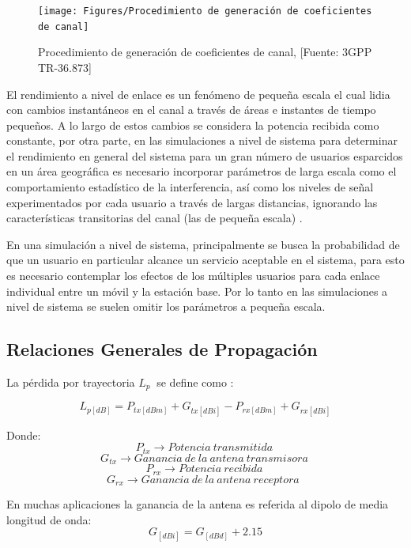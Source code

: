 \begin{figure}[th]
\centering
\texttt{[image: Figures/Procedimiento de generación de coeficientes de canal]}
\decoRule
\caption[Procedimiento de generación de coeficientes de canal]{Procedimiento de generación de coeficientes de canal, [Fuente: 3GPP TR-36.873]}
\label{fig:Procedimiento de generacion de coeficientes de canal}
\end{figure}

El rendimiento a nivel de enlace es un fenómeno de pequeña escala el cual lidia con cambios instantáneos en el canal a través de áreas e instantes de tiempo pequeños. A lo largo de estos cambios se considera la potencia recibida como constante, por otra parte, en las simulaciones a nivel de sistema para determinar el rendimiento en general del sistema para un gran número de usuarios esparcidos en un área geográfica es necesario incorporar parámetros de larga escala como el comportamiento estadístico de la interferencia, así como los niveles de señal experimentados por cada usuario a través de largas distancias, ignorando las características transitorias del canal (las de pequeña escala) \parencite{Tranter2003}.\newline

En una simulación a nivel de sistema, principalmente se busca la probabilidad de que un usuario en particular alcance un servicio aceptable en el sistema, para esto es necesario contemplar los efectos de los múltiples usuarios para cada enlace individual entre un móvil y la estación base. Por lo tanto en las simulaciones a nivel de sistema se suelen omitir los parámetros a pequeña escala.

\subsection{Relaciones Generales de Propagación}

La pérdida por trayectoria $L_p\ $ se define como \parencite{Correia2018}:

\begin{equation}
L_{p[dB]}=P_{tx[dBm]}+G_{tx[dBi]}-P_{rx\left[dBm\right]}+G_{rx\left[dBi\right]}
\label{eqn:Lp}
\end{equation}

Donde:
\[P_{tx}\to Potencia\ transmitida\ \] 
\[G_{tx}\to Ganancia\ de\ la\ antena\ transmisora\ \] 
\[P_{rx}\to Potencia\ recibida\ \] 
\[G_{rx}\to Ganancia\ de\ la\ antena\ receptora\ \ \] 

En muchas aplicaciones la ganancia de la antena es referida al dipolo de media longitud de onda:
\begin{equation}
G_{[dBi]} = G_{[dBd]}+{2.15} 
\label{eqn:Gain}
\end{equation}

